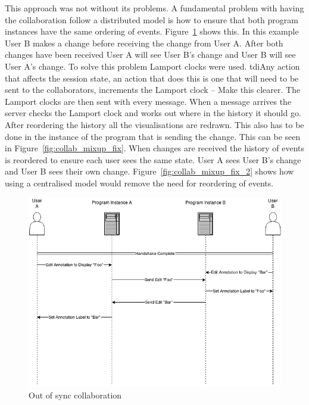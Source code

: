 This approach was not without its problems.  A fundamental problem with having the collaboration follow a distributed model is how to ensure that both program instances have the same ordering of events.  Figure~\ref{fig:collab_mixup} shows this.  In this example User B makes a change before receiving the change from User A.  After both changes have been received User A will see User B's change and User B will see User A's change.  To solve this problem Lamport clocks were used.  tdi{Any action that affects the session state, an action that does this is one that will need to be sent to the collaborators, increments the Lamport clock -- Make this clearer}.  The Lamport clocks are then sent with every message.  When a message arrives the server checks the Lamport clock and works out where in the history it should go.  After reordering the history all the visualisations are redrawn.  This also has to be done in the instance of the program that is sending the change.  This can be seen in Figure~\ref{fig:collab_mixup_fix}.  When changes are received the history of events is reordered to ensure each user sees the same state.  User A sees User B's change and User B sees their own change.  Figure~\ref{fig:collab_mixup_fix_2} shows how using a centralised model would remove the need for reordering of events.


\begin{figure}[h!]
    \centering
    \includegraphics[width=\textwidth]{images/minf_collab_mixup.png}
    \caption{Out of sync collaboration}
    \label{fig:collab_mixup}
\end{figure}

